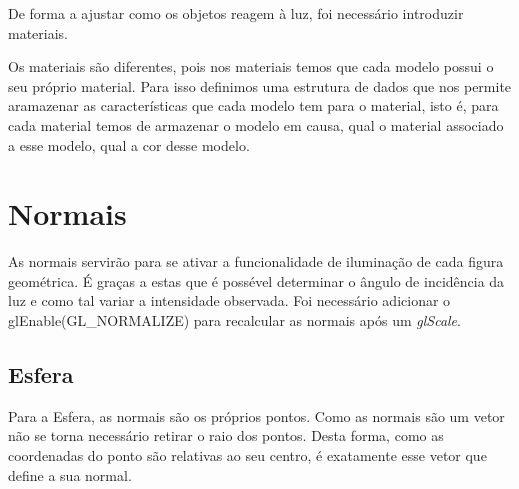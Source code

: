De forma a ajustar como os objetos reagem à luz, foi necessário introduzir materiais. 

Os materiais são diferentes, pois nos materiais temos que cada modelo possui o seu próprio material. Para isso definimos uma  estrutura de dados que nos permite aramazenar as características que cada modelo tem para o material, isto é, para cada material temos de armazenar o modelo em causa, qual o material associado a esse modelo, qual a cor desse
modelo. 


\section{Normais}

As normais servirão para se ativar a funcionalidade de iluminação de cada figura geométrica. É graças a estas que é possével determinar o ângulo de incidência da luz e como tal variar a intensidade observada.
Foi necessário adicionar o glEnable(GL\_NORMALIZE) para recalcular as normais após um \textit{glScale}.


\subsection{Esfera}

Para a Esfera, as normais são os próprios pontos. Como as normais são um vetor não se torna necessário retirar o raio dos pontos. Desta forma, como as coordenadas do ponto são relativas ao seu centro, é exatamente esse vetor que define a sua normal.

